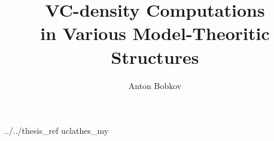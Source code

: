 \documentclass [PhD] {uclathes}
\title          {VC-density Computations \\
                in Various Model-Theoritic Structures}
\author         {Anton Bobkov}
\begin{document}
\makeintropages




 


 {../../thesis_ref}    %
 {uclathes_my}
\end{document}
